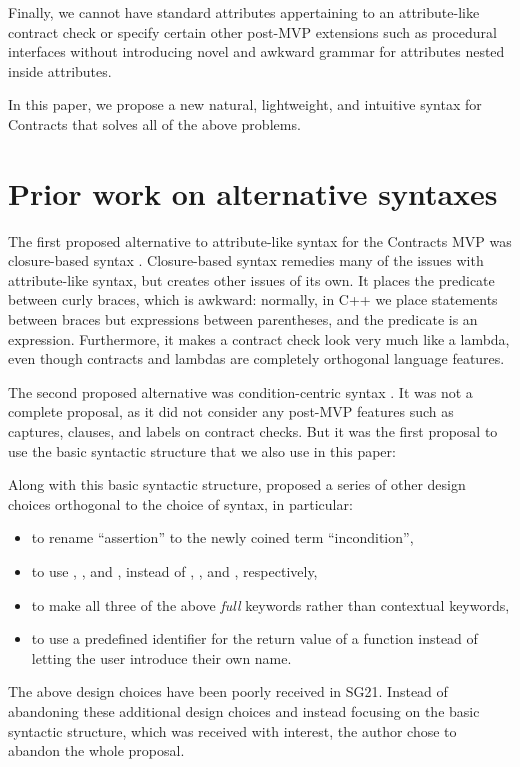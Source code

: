 Finally, we cannot have standard attributes appertaining to an attribute-like contract check or specify certain other post-MVP extensions such as procedural interfaces without introducing novel and awkward grammar for attributes nested inside attributes.

In this paper, we propose a new natural, lightweight, and intuitive syntax for Contracts that solves all of the above problems.
 

\section{Prior work on alternative syntaxes}

The first proposed alternative to attribute-like syntax for the Contracts MVP was closure-based syntax \cite{P2461R1}. Closure-based syntax remedies many of the issues with attribute-like syntax, but creates other issues of its own. It places the predicate between curly braces, which is awkward: normally, in C++ we place statements between braces but expressions between parentheses, and the predicate is an expression. Furthermore, it makes a contract check look very much like a lambda, even though contracts and lambdas are completely orthogonal language features.

The second proposed alternative was condition-centric syntax \cite{P2737R0}. It was not a complete proposal, as it did not consider any post-MVP features such as captures,  clauses, and labels on contract checks. But it was the first proposal to use the basic syntactic structure that we also use in this paper:

\phantom{~~~}

Along with this basic syntactic structure, \cite{P2737R0} proposed a series of other design choices orthogonal to the choice of syntax, in particular:
\begin{itemize}
\item to rename ``assertion'' to the newly coined term ``incondition'',
\item to use , , and , instead of , , and , respectively,
\item to make all three of the above \emph{full} keywords rather than contextual keywords,
\item to use a predefined identifier  for the return value of a function instead of letting the user introduce their own name.
\end{itemize}
The above design choices have been poorly received in SG21. Instead of abandoning these additional design choices and instead focusing on the basic syntactic structure, which was received with interest, the author chose to abandon the whole proposal.

